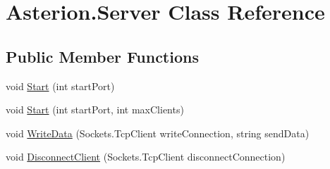 \hypertarget{classAsterion_1_1Server}{\section{Asterion.\-Server Class Reference}
\label{classAsterion_1_1Server}
}
\subsection*{Public Member Functions}
\begin{DoxyCompactItemize}
\item 
void \hyperlink{classAsterion_1_1Server_aa7c90324f46d4daebcead8ab7a7ca2a8}{Start} (int start\-Port)
\item 
void \hyperlink{classAsterion_1_1Server_aa3093eb682b2f1d7ef888808b4ca5361}{Start} (int start\-Port, int max\-Clients)
\item 
void \hyperlink{classAsterion_1_1Server_aab29eeff57c906e4e0f86e10cd02131f}{Write\-Data} (Sockets.\-Tcp\-Client write\-Connection, string send\-Data)
\item 
void \hyperlink{classAsterion_1_1Server_a93954ee71f8d0324bcc0d6616952b2a1}{Disconnect\-Client} (Sockets.\-Tcp\-Client disconnect\-Connection)
\end{DoxyCompactItemize}
